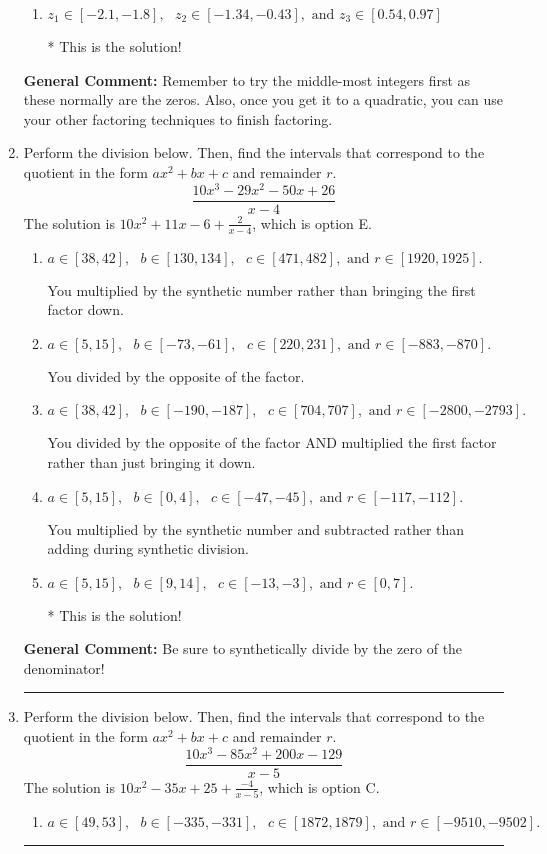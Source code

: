 \documentclass{extbook}[14pt]
\newcommand{\litem}[1]{\item #1

\rule{\textwidth}{0.4pt}}
\begin{document}
\begin{enumerate}
{\begin{enumerate}[label=\Alph*.]
 Distractor 2: Corresponds to inversing rational roots.
\item \( z_1 \in [-2.1, -1.8], \text{   }  z_2 \in [-1.34, -0.43], \text{   and   } z_3 \in [0.54, 0.97] \)

* This is the solution!
\end{enumerate}

\textbf{General Comment:} Remember to try the middle-most integers first as these normally are the zeros. Also, once you get it to a quadratic, you can use your other factoring techniques to finish factoring.
}
\litem{
Perform the division below. Then, find the intervals that correspond to the quotient in the form $ax^2+bx+c$ and remainder $r$.
\[ \frac{10x^{3} -29 x^{2} -50 x + 26}{x -4} \]The solution is \( 10x^{2} +11 x -6 + \frac{2}{x -4} \), which is option E.\begin{enumerate}[label=\Alph*.]
\item \( a \in [38, 42], \text{   } b \in [130, 134], \text{   } c \in [471, 482], \text{   and   } r \in [1920, 1925]. \)

 You multiplied by the synthetic number rather than bringing the first factor down.
\item \( a \in [5, 15], \text{   } b \in [-73, -61], \text{   } c \in [220, 231], \text{   and   } r \in [-883, -870]. \)

 You divided by the opposite of the factor.
\item \( a \in [38, 42], \text{   } b \in [-190, -187], \text{   } c \in [704, 707], \text{   and   } r \in [-2800, -2793]. \)

 You divided by the opposite of the factor AND multiplied the first factor rather than just bringing it down.
\item \( a \in [5, 15], \text{   } b \in [0, 4], \text{   } c \in [-47, -45], \text{   and   } r \in [-117, -112]. \)

 You multiplied by the synthetic number and subtracted rather than adding during synthetic division.
\item \( a \in [5, 15], \text{   } b \in [9, 14], \text{   } c \in [-13, -3], \text{   and   } r \in [0, 7]. \)

* This is the solution!
\end{enumerate}

\textbf{General Comment:} Be sure to synthetically divide by the zero of the denominator!
}
\litem{
Perform the division below. Then, find the intervals that correspond to the quotient in the form $ax^2+bx+c$ and remainder $r$.
\[ \frac{10x^{3} -85 x^{2} +200 x -129}{x -5} \]The solution is \( 10x^{2} -35 x + 25 + \frac{-4}{x -5} \), which is option C.\begin{enumerate}[label=\Alph*.]
\item \( a \in [49, 53], \text{   } b \in [-335, -331], \text{   } c \in [1872, 1879], \text{   and   } r \in [-9510, -9502]. \)


\end{enumerate}}
\end{enumerate}
\end{document}
